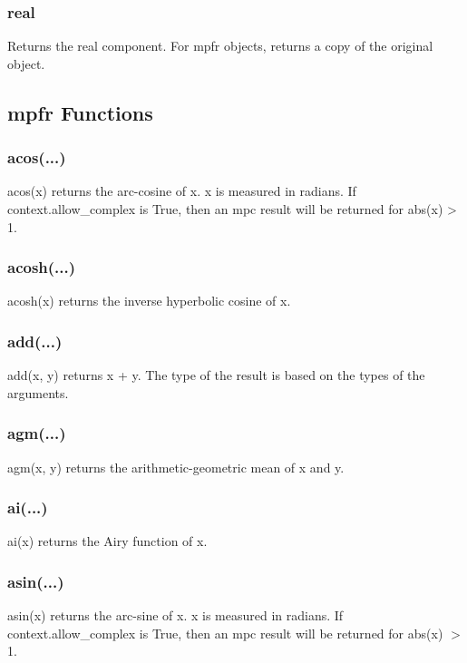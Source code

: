 \subsubsection{real}

Returns the real component. For mpfr objects, returns a copy of the original object.



\subsection{mpfr Functions}

\subsubsection{acos(...)}

acos(x) returns the arc-cosine of x. x is measured in radians. If context.allow\_complex is True,
then an mpc result will be returned for abs(x) > 1.

\subsubsection{acosh(...)}

acosh(x) returns the inverse hyperbolic cosine of x.

\subsubsection{add(...)}

add(x, y) returns x + y. The type of the result is based on the types of the arguments.

\subsubsection{agm(...)}

agm(x, y) returns the arithmetic-geometric mean of x and y.

\subsubsection{ai(...)}

ai(x) returns the Airy function of x.

\subsubsection{asin(...)}

asin(x) returns the arc-sine of x. x is measured in radians. If context.allow\_complex is True,
then an mpc result will be returned for abs(x) $>$ 1.

